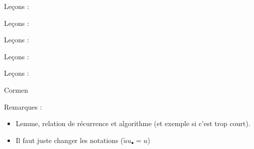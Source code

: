 \documentclass[../agregation.tex]{subfiles}
\begin{document}
Leçons :
\begin{itemize}
\end{itemize}
\textcite[p. 185]{WOL} \textcite{CAR}

Leçons :
\begin{itemize}
\end{itemize}

Leçons :
\begin{itemize}
\end{itemize}


%

Leçons :
\begin{itemize}
\end{itemize}

Leçons :
\begin{itemize}
\end{itemize}

Cormen

Remarques :
\begin{itemize}
	\item Lemme, relation de récurrence et algorithme (et exemple si c'est trop court).
	\item Il faut juste changer les notations ($\widetilde{u}u_\bullet=u$)
\end{itemize}

\end{document}
